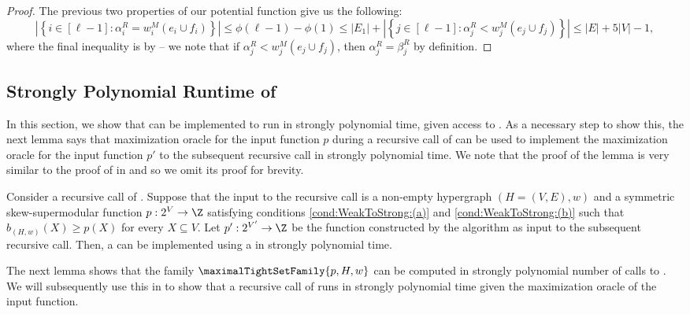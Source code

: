 \begin{proof}
      The previous two properties of our potential function give us the following:
      $$\left|\left\{i \in [\ell - 1] : \alpha_i^R = w_i^M(e_i \cup f_i)\right\}\right| \leq \phi(\ell - 1) - \phi(1) \leq |E_1| + \left|\left\{j \in [\ell - 1] : \alpha_j^R < w_j^M(e_j\cup f_j)\right\}\right| \leq |E| + 5|V| - 1,$$ 
      where the final inequality is by  -- we note that if $\alpha_j^R < w_j^M(e_j\cup f_j)$, then $\alpha_j^R = \beta_j^R$ by definition.
\end{proof}

\iffalse
\subsection{Strongly Polynomial Runtime of }\label{sec:WeakToStrongCover:strongly-poly-runtime:main}
In this section, we show that  can be implemented to run in strongly polynomial time, given access to . As a necessary step to show this, the next lemma says that maximization oracle for the input function $p$ during a recursive call of  can be used to implement the maximization oracle for the input function $p'$ to the subsequent recursive call in strongly polynomial time. We note that the proof of the lemma is very similar to the proof of  in  and so we omit its proof for brevity.

\begin{lemma}\label{lem:WeakToStrong:p'-oracle-from-p-oracle}
Consider a recursive call of . Suppose that the input to the recursive call is a non-empty hypergraph $(H = (V, E), w)$ and a symmetric skew-supermodular function $p:2^V\rightarrow \Z$ satisfying conditions \ref{cond:WeakToStrong:(a)} and \ref{cond:WeakToStrong:(b)} such that $b_{(H,w)}(X) \geq p(X)$ for every $X \subseteq V$. Let $p':2^{V'}\rightarrow\Z$ be the function constructed by the algorithm as input to the subsequent recursive call. 
Then, a   can be implemented using a   in strongly polynomial time.
\end{lemma}

The next lemma shows that the family $\maximalTightSetFamily{p, H, w}$ can be computed in strongly polynomial number of calls to . We will subsequently use this in  to show that a recursive call of  runs in strongly polynomial time given the maximization oracle of the input function.

